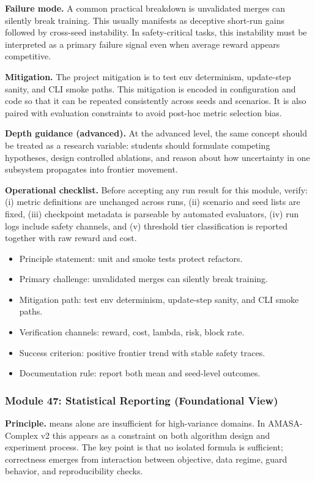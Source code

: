\documentclass[conference]{IEEEtran}
\begin{document}
\textbf{Failure mode.} A common practical breakdown is unvalidated merges can silently break training. This usually manifests as deceptive short-run gains followed by cross-seed instability. In safety-critical tasks, this instability must be interpreted as a primary failure signal even when average reward appears competitive.

\textbf{Mitigation.} The project mitigation is to test env determinism, update-step sanity, and CLI smoke paths. This mitigation is encoded in configuration and code so that it can be repeated consistently across seeds and scenarios. It is also paired with evaluation constraints to avoid post-hoc metric selection bias.

\textbf{Depth guidance (advanced).} At the advanced level, the same concept should be treated as a research variable: students should formulate competing hypotheses, design controlled ablations, and reason about how uncertainty in one subsystem propagates into frontier movement.

\textbf{Operational checklist.} Before accepting any run result for this module, verify: (i) metric definitions are unchanged across runs, (ii) scenario and seed lists are fixed, (iii) checkpoint metadata is parseable by automated evaluators, (iv) run logs include safety channels, and (v) threshold tier classification is reported together with raw reward and cost.

\begin{itemize}[leftmargin=*]
  \item Principle statement: unit and smoke tests protect refactors.
  \item Primary challenge: unvalidated merges can silently break training.
  \item Mitigation path: test env determinism, update-step sanity, and CLI smoke paths.
  \item Verification channels: reward, cost, lambda, risk, block rate.
  \item Success criterion: positive frontier trend with stable safety traces.
  \item Documentation rule: report both mean and seed-level outcomes.
\end{itemize}


\subsubsection{Module 47: Statistical Reporting (Foundational View)}
\textbf{Principle.} means alone are insufficient for high-variance domains. In AMASA-Complex v2 this appears as a constraint on both algorithm design and experiment process. The key point is that no isolated formula is sufficient; correctness emerges from interaction between objective, data regime, guard behavior, and reproducibility checks.
\end{document}
